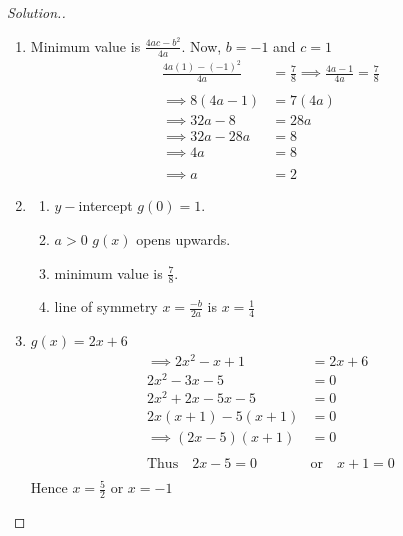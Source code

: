 \documentclass[11pt,a4paper]{article}
\theoremstyle{definition}
\newenvironment{solution}
  {\renewcommand{\qedsymbol}{}\begin{proof}[\textit{Solution}.]}
  {\end{proof}}
\begin{document}
\begin{solution}

\begin{enumerate}
\item Minimum value is $\frac{4ac-b^2}{4a}$. Now, $b=-1$ and $c=1$
\begin{align*}
\frac{4a(1)-(-1)^2}{4a} & =\frac{7}{8}\implies \frac{4a-1}{4a}=\frac{7}{8}\\\\
\implies 8(4a-1) & = 7(4a)\\
\implies  32a-8 & = 28a\\
\implies 32a-28a & = 8\\
\implies 4a & = 8\\\\
\implies a & =2
\end{align*}
\item
\begin{enumerate}
    \item $y-$intercept $g(0)=1$.
    \item $a>0$ $g(x)$ opens upwards.
    \item minimum value is $\frac{7}{8}$.
    \item line of symmetry $x=\frac{-b}{2a}$ is $x=\frac{1}{4}$


\begin{figure}[H]
\centering
{}
\end{figure}


\end{enumerate}
\item $g(x)=2x+6$
\begin{align*}
\implies 
2x^2-x+1 & = 2x+6\\
2x^2-3x-5 & =0\\
2x^2+2x-5x-5 & =0\\
2x(x+1)-5(x+1) & = 0\\
\implies (2x-5)(x+1) & = 0\\\\
\text{Thus}\quad  2x-5=0\quad  &\text{or}\quad  x+1=0\\
\end{align*}
Hence $x=\frac{5}{2}$ or $x=-1$\\
\end{enumerate}
\end{solution}
\end{document}
